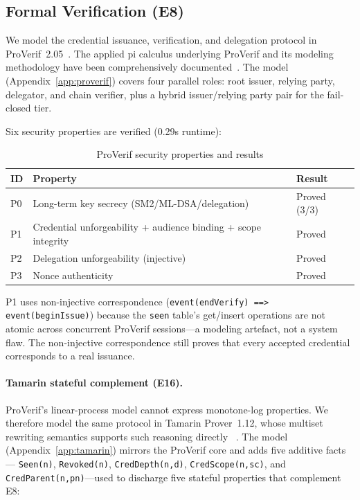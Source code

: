 \documentclass[10pt,twocolumn]{IEEEtran}
\begin{document}
\subsection{Formal Verification (E8)}

We model the credential issuance, verification, and delegation protocol
in ProVerif~2.05~\cite{ref:proverif}. The applied pi calculus underlying
ProVerif and its modeling methodology have been comprehensively
documented~\cite{ref:blanchet-proverif-survey}. The model
(Appendix~\ref{app:proverif}) covers four parallel roles: root issuer,
relying party, delegator, and chain verifier, plus a hybrid
issuer/relying party pair for the fail-closed tier.

Six security properties are verified (0.29s runtime):

\begin{table}[t]
  \caption{ProVerif security properties and results}
  \label{tab:proverif}
  \centering\small
  \begin{tabular}{lll}
    \toprule
    \textbf{ID} & \textbf{Property} & \textbf{Result} \\
    \midrule
    P0 & Long-term key secrecy (SM2/ML-DSA/delegation) & Proved (3/3) \\
    P1 & Credential unforgeability + audience binding + scope integrity & Proved \\
    P2 & Delegation unforgeability (injective) & Proved \\
    P3 & Nonce authenticity & Proved \\
    \bottomrule
  \end{tabular}
\end{table}

P1 uses non-injective correspondence (\texttt{event(endVerify) ==>
event(beginIssue)}) because the \texttt{seen} table's get/insert operations
are not atomic across concurrent ProVerif sessions---a modeling artefact,
not a system flaw. The non-injective correspondence still proves that every
accepted credential corresponds to a real issuance.

\paragraph{Tamarin stateful complement (E16).}
ProVerif's linear-process model cannot express monotone-log properties.
We therefore model the same protocol in Tamarin Prover~1.12, whose
multiset rewriting semantics supports such reasoning directly
~\cite{ref:tamarin-signal}. The model (Appendix~\ref{app:tamarin})
mirrors the ProVerif core and adds five additive facts---
\texttt{Seen(n)}, \texttt{Revoked(n)}, \texttt{CredDepth(n,d)},
\texttt{CredScope(n,sc)}, and \texttt{CredParent(n,pn)}---used to
discharge five stateful properties that complement E8:
\end{document}
